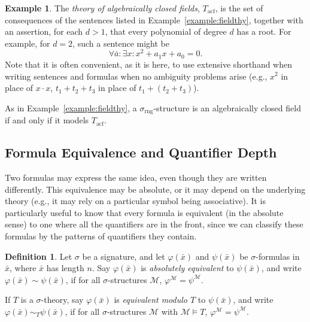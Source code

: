 \documentclass{article}
\theoremstyle{plain}
\theoremstyle{definition}
\newtheorem{defn}[thm]{Definition}
\newtheorem{example}[thm]{Example}
\newcommand{\defterm}{\emph}
\newcommand{\ringsig}{\sigma_{\operatorname{rng}}}
\newcommand{\acf}{T_{\operatorname{acf}}}
\newcommand{\tuple}{\bar}
\renewcommand{\phi}{\varphi}
\begin{document}
\begin{example}
  The \defterm{theory of algebraically closed fields}, $\acf$, is the
  set of consequences of the sentences listed in
  Example~\ref{example:fieldthy}, together with an assertion, for each
  $d > 1$, that every polynomial of degree $d$ has a root. For
  example, for $d = 2$, such a sentence might be $$\forall \tuple{a}:
  \exists x: x^2 + a_1x + a_0 = 0 \text{.}$$ Note that it is often
  convenient, as it is here, to use extensive shorthand when writing
  sentences and formulas when no ambiguity problems arise (e.g., $x^2$
  in place of $x \cdot x$, $t_1 + t_2 + t_3$ in place of $t_1 + (t_2 +
  t_3)$).

  As in Example~\ref{example:fieldthy}, a $\ringsig$-structure is an
  algebraically closed field if and only if it models $\acf$.
\end{example}

\subsection{Formula Equivalence and Quantifier Depth}

Two formulas may express the same idea, even though they are written
differently. This equivalence may be absolute, or it may depend on the
underlying theory (e.g., it may rely on a particular symbol being
associative). It is particularly useful to know that every formula is
equivalent (in the absolute sense) to one where all the quantifiers
are in the front, since we can classify these formulas by the patterns
of quantifiers they contain.

\begin{defn}
  Let $\sigma$ be a signature, and let $\phi(\tuple{x})$ and
  $\psi(\tuple{x})$ be $\sigma$-formulas in $\tuple{x}$, where
  $\tuple{x}$ has length $n$. Say $\phi(\tuple{x})$ is
  \defterm{absolutely equivalent} to $\psi(\tuple{x})$, and write
  $\phi(\tuple{x}) \sim \psi(\tuple{x})$, if for all
  $\sigma$-structures $\mathcal{M}$, $\phi^\mathcal{M} =
  \psi^\mathcal{M}$.

  If $T$ is a $\sigma$-theory, say $\phi(\tuple{x})$ is
  \defterm{equivalent modulo $T$} to $\psi(\tuple{x})$, and write
  $\phi(\tuple{x}) \sim_T \psi(\tuple{x})$, if for all
  $\sigma$-structures $\mathcal{M}$ with $\mathcal{M} \models T$,
  $\phi^\mathcal{M} = \psi^\mathcal{M}$.
\end{defn}
\end{document}
